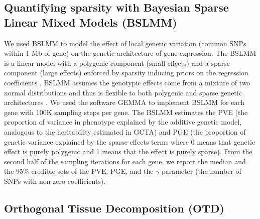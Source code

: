 \documentclass[10pt,letterpaper]{article}
\begin{document}
\subsection*{Quantifying sparsity with Bayesian Sparse Linear Mixed
Models
(BSLMM)}\label{quantifying-sparsity-with-bayesian-sparse-linear-mixed-models-bslmm}

We used BSLMM \cite{Zhou_2013} to model the effect of local genetic variation
(common SNPs within 1 Mb of gene) on the genetic architecture of gene
expression. The BSLMM is a linear model with a polygenic component (small effects) and a sparse component (large effects)
enforced by sparsity inducing priors on the
regression coefficients \cite{Zhou_2013}. BSLMM assumes the genotypic effects come from a mixture of two normal distributions and thus is flexible to both polygenic and sparse genetic architectures \cite{Zhou_2013}. We used the software GEMMA \cite{Zhou_2012} to
implement BSLMM for each gene %
with 100K sampling steps per gene.
 The BSLMM estimates the PVE (the proportion of variance in
phenotype explained by the additive genetic model, analogous to the heritability estimated in GCTA) and PGE (the proportion of genetic variance explained by the sparse effects terms where 0 means that genetic effect is purely polygenic and 1 means that the effect is purely sparse). From the second half of the sampling iterations for each gene, we report the median and the 95\% credible sets of the
PVE, PGE, and the \textbar{}\(\gamma\)\textbar{} parameter (the number of SNPs with non-zero coefficients).

\subsection*{Orthogonal Tissue Decomposition (OTD)}\label{orthogonal-tissue-decomposition}
\end{document}

